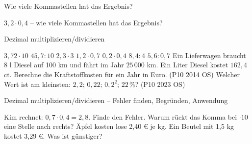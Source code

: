 \setcounter{aufgabe}{22}

\begin{aufgabe}{Wie viele Kommastellen hat das Ergebnis?}
\begin{teile}
\teil $3{,}2 \cdot 0{,}4$ – wie viele Kommastellen hat das Ergebnis? \leerfeld
\end{teile}
\end{aufgabe}

\begin{aufgabe}{Dezimal multiplizieren/dividieren}
\begin{teile}
\teil $3{,}72 \cdot 10$
\teil $45{,}7 : 10$
\teil $2{,}3 \cdot 3$
\teil $1{,}2 \cdot 0{,}7$
\teil $0{,}2 \cdot 0{,}4$
\teil $8{,}4 : 4$
\teil $5{,}6 : 0{,}7$
\teil Ein Lieferwagen braucht 8 l Diesel auf 100 km und fährt im Jahr $25\,000$ km. Ein Liter Diesel kostet $162{,}4$ ct. Berechne die Kraftstoffkosten für ein Jahr in Euro. \hfill (P10 2014 OS)
\teil Welcher Wert ist am kleinsten: $2{,}2$; $0{,}22$; $0{,}2^2$; $22\,\%$? \hfill (P10 2023 OS) \\ \leerfeld
\end{teile}
\end{aufgabe}

\begin{aufgabe}{Dezimal multiplizieren/dividieren – Fehler finden, Begründen, Anwendung}
\begin{teile}
\teil Kim rechnet: $0{,}7 \cdot 0{,}4 = 2{,}8$. Finde den Fehler.
\teil Warum rückt das Komma bei $\cdot 10$ eine Stelle nach rechts?
\teil Äpfel kosten lose 2,40 € je kg. Ein Beutel mit 1,5 kg kostet 3,29 €. Was ist günstiger?
\end{teile}
\end{aufgabe}
